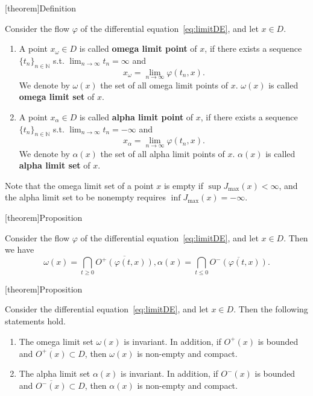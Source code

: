 \documentclass[12pt]{report}
\theoremstyle{definition}
\begin{document}
[theorem]{Definition}
\begin{Omega and alpha limit sets}
    Consider the flow $\varphi$ of the differential equation~\eqref{eq:limitDE},
    and let $x\in D$.
    \begin{enumerate}[label = (\roman*)]
        \item A point $x_\omega\in D$ is called \textbf{omega limit point} of
            $x$, if there exists a sequence ${\{t_n\}}_{n\in\mathbb{N}}$
            s.t. $\lim_{n\rightarrow\infty}t_n=\infty$ and
            \[
                x_\omega=\lim_{n\rightarrow\infty}\varphi(t_n,x).
            \]
            We denote by $\omega(x)$ the set of all omega limit points of $x$.
            $\omega(x)$ is called \textbf{omega limit set} of $x$.
        \item A point $x_\alpha\in D$ is called \textbf{alpha limit point} of
            $x$, if there exists a sequence ${\{t_n\}}_{n\in\mathbb{N}}$
            s.t. $\lim_{n\rightarrow\infty}t_n = -\infty$ and
            \[
                x_\alpha = \lim_{n\rightarrow\infty}\varphi(t_n, x).
            \]
            We denote by $\alpha(x)$ the set of all alpha limit points of $x$.
            $\alpha(x)$ is called \textbf{alpha limit set} of $x$.
    \end{enumerate} 
\end{Omega and alpha limit sets}
Note that the omega limit set of a point $x$ is empty if
$\sup{J_{\text{max}}(x)}<\infty$, and the alpha limit set to be nonempty
requires $\inf{J_{\text{max}}(x)}=-\infty$.

[theorem]{Proposition}
\begin{alternative characterisation of limit sets}
    Consider the flow $\varphi$ of the differential equation~\eqref{eq:limitDE},
    and let $x\in D$. Then we have
    \[
        \omega(x)=\bigcap_{t\ge 0}\overline{O^{+}(\varphi(t,x))},
        \alpha(x)=\bigcap_{t\le 0}\overline{O^{-}(\varphi(t,x))}.
    \]
\end{alternative characterisation of limit sets}

[theorem]{Proposition}
\begin{properties of omega and alpha limit sets}
    Consider the differential equation~\eqref{eq:limitDE}, and let $x\in D$.
    Then the following statements hold.
    \begin{enumerate}[label = (\roman*)]
        \item The omega limit set $\omega(x)$ is invariant.
            In addition, if $O^{+}(x)$ is bounded and 
            $\overline{O^+(x)}\subset D$, 
            then $\omega(x)$ is non-empty and compact.
        \item The alpha limit set $\alpha(x)$ is invariant.
            In addition, if $O^{-}(x)$ is bounded and 
            $\overline{O^-(x)}\subset D$, 
            then $\alpha(x)$ is non-empty and compact.
    \end{enumerate} 
\end{properties of omega and alpha limit sets}
\end{document}
